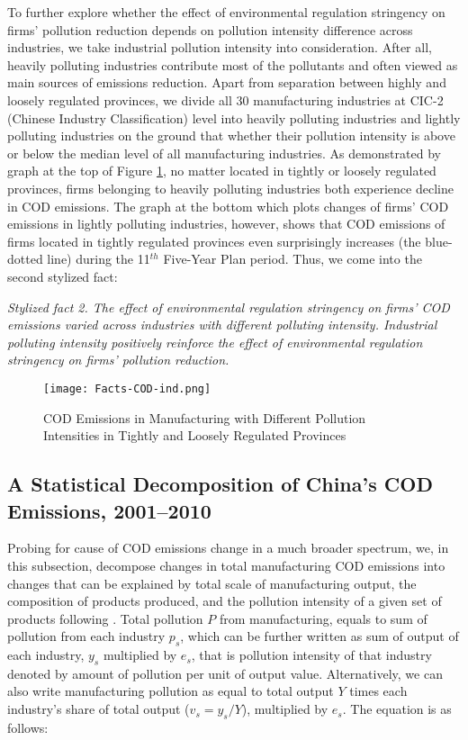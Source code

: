 \documentclass[12pt,english]{article}
\begin{document}
To further explore whether the effect of environmental regulation stringency on firms' pollution reduction depends on pollution intensity difference across industries, we take industrial pollution intensity into consideration. After all, heavily polluting industries contribute most of the pollutants and often viewed as main sources of emissions reduction. Apart from separation between highly and loosely regulated provinces, we divide all 30 manufacturing industries at CIC-2 (Chinese Industry Classification) level into heavily polluting industries and lightly polluting industries on the ground that whether their pollution intensity is above or below the median level of all manufacturing industries. As demonstrated by graph at the top of Figure \ref{fig:COD industries}, no matter located in tightly or loosely regulated provinces, firms belonging to heavily polluting industries both experience decline in COD emissions. The graph at the bottom which plots changes of firms' COD emissions in lightly polluting industries, however, shows that COD emissions of firms located in tightly regulated provinces even surprisingly increases (the blue-dotted line) during the 11$^{th}$ Five-Year Plan period. Thus, we come into the second stylized fact:

\textit{Stylized fact 2. The effect of environmental regulation stringency on firms' COD emissions varied across industries with different polluting intensity. Industrial polluting intensity positively reinforce the effect of environmental regulation stringency on firms' pollution reduction.}

\begin{figure}[htbp]
	\caption{COD Emissions in Manufacturing with Different Pollution Intensities in Tightly and Loosely Regulated Provinces }
	\label{fig:COD industries}
	\centering
	\texttt{[image: Facts-COD-ind.png]}
\end{figure}


\subsection {A Statistical Decomposition of China's COD Emissions, 2001--2010}\label{sec:decomposition}

Probing for cause of COD emissions change in a much broader spectrum, we, in this subsection, decompose changes in total manufacturing COD emissions into changes that can be explained by total scale of manufacturing output, the composition of products produced, and the pollution intensity of a given set of products following \citet*{levinson2009technology}. Total pollution $P$ from manufacturing, equals to sum of pollution from each industry $p_{s}$, which can be further written as sum of output of each industry, $y_{s}$ multiplied by $e_{s}$, that is pollution intensity of that industry denoted by amount of pollution per unit of output value. Alternatively, we can also write manufacturing pollution as equal to total output $Y$ times each industry's share of total output ($v_{s}=y_{s}/Y$), multiplied by $e_{s}$. The equation is as follows:
\end{document}
